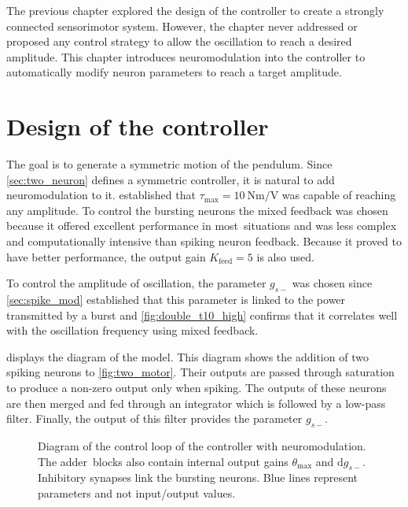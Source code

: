 The previous chapter explored the design of the controller to create a strongly connected sensorimotor system.
However, the chapter never addressed or proposed any control strategy to allow the oscillation to reach a desired amplitude.
This chapter introduces neuromodulation into the controller to automatically modify neuron parameters to reach a target amplitude.

\section{Design of the controller}

The goal is to generate a symmetric motion of the pendulum.
Since \cref{sec:two_neuron} defines a symmetric controller, it is natural to add neuromodulation to it.
 established that $\tau_\text{max} = \qty{10}{\newton\meter\per\volt}$ was capable of reaching any amplitude.
To control the bursting neurons the mixed feedback was chosen because it offered excellent performance in most situations and was less complex and computationally intensive than spiking neuron feedback.
Because it proved to have better performance, the output gain $K_\text{feed} = 5$ is also used.

To control the amplitude of oscillation, the parameter $g_{s-}$ was chosen since \cref{sec:spike_mod} established that this parameter is linked to the power transmitted by a burst and \cref{fig:double_t10_high} confirms that it correlates well with the oscillation frequency using mixed feedback.

 displays the diagram of the model.
This diagram shows the addition of two spiking neurons to \cref{fig:two_motor}.
Their outputs are passed through saturation to produce a non-zero output only when spiking.
The outputs of these neurons are then merged and fed through an integrator which is followed by a low-pass filter.
Finally, the output of this filter provides the parameter $g_{s-}$.
 
\begin{figure}[!htbp]
    \centering
    \caption{Diagram of the control loop of the controller with neuromodulation. The adder blocks also contain internal output gains $\theta_\text{max}$ and $\mathrm{d}g_{s-}$. Inhibitory synapses link the bursting neurons. Blue lines represent parameters and not input/output values.}
    \label{fig:neuromod_motor}
\end{figure}


